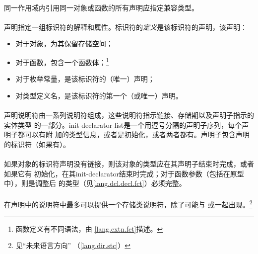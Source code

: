 {\paragraph{}
同一作用域内引用同一对象或函数的所有声明应指定兼容类型。

\semantic
\paragraph{}
声明指定一组标识符的解释和属性。标识符的\textit{定义}是该标识符的声明，该声明：
\begin{itemize}
  \item{对于对象，为其保留存储空间；}
  \item{对于函数，包含一个函数体；\footnote{函数定义有不同语法，由
    \ref{lang.extn.fct}描述。}}
  \item{对于枚举常量，是该标识符的（唯一）声明；}
  \item{对类型定义名，是该标识符的第一个（或唯一）声明。}
\end{itemize}

\paragraph{}
声明说明符由一系列说明符组成，这些说明符指示链接、存储期以及声明子指示的实体类型
的一部分。init-declarator-list是一个用逗号分隔的声明子序列，每个声明子都可以有附
加的类型信息，或者是初始化，或者两者都有。声明子包含声明的标识符（如果有）。

\paragraph{}
如果对象的标识符声明没有链接，则该对象的类型应在其声明子结束时完成，或者如果它有
初始化，在其init-declarator结束时完成；对于函数参数（包括在原型中），则是调整后
的类型（见\ref{lang.dcl.decl.fct}）必须完整。


\syntax
\paragraph{}

\constraint
\paragraph{}
在声明中的说明符中最多可以提供一个存储类说明符，除了可能与
或一起出现。\footnote{见``未来语言方向''
（\ref{lang.dir.stc}）}

}
